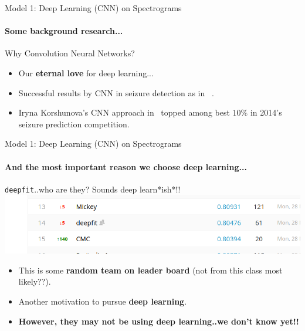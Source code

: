\documentclass{beamer}
\begin{document}
\begin{frame}{Model 1: Deep Learning (CNN) on Spectrograms}
  \framesubtitle{Some background research...}

  \begin{block}{Why Convolution Neural Networks?}
    \begin{itemize}
    \item Our \textbf{eternal love} for deep learning...
    \item Successful results by CNN in seizure detection as in
      ~\cite{korshunova_faculty_2015,mirowski2008comparing}.
    \item Iryna Korshunova's CNN approach in~\cite{korshunova_faculty_2015}
      topped among best $10\%$ in 2014's seizure prediction competition.
    \end{itemize}
  \end{block}
\end{frame}


\begin{frame}{Model 1: Deep Learning (CNN) on Spectrograms}
  \framesubtitle{And the most important reason we choose deep learning...}
  
  \begin{block}{\texttt{deepfit}..who are they? Sounds deep learn*ish*!!}
    \includegraphics[scale=0.3]{img/who_are_they.png}
  \end{block}


  \begin{itemize}
  \item This is some \textbf{random team on leader board} (not from this class most likely??).
  \item Another motivation to pursue \textbf{deep learning}.
    \pause
  \item \textbf{However, they may not be using deep learning..we don't know yet!!}

  \end{itemize}

\end{frame}
\end{document}
